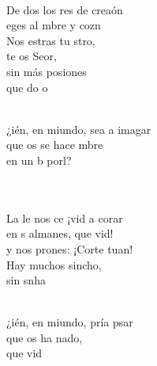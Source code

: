 \begin{cancion}
	  \\
\jump
	De dos los res de  creaón\\
	eges al mbre y  cozn \\
	Nos estras tu stro, \\
	te os Seor,\\
	sin más posiones \\
	que do  o \\\jump\\
	\begin{chorus}%
	¿ién, en miundo, sea a imagar \\
	que os se hace mbre\\
	en un b porl?  \\
	\end{chorus}%
	\jump\\
	   \\
	La le nos ce ¡vid a corar\\
	en s almanes, que  vid! \\
	y  nos prones: ¡Corte tuan! \\
	Hay muchos sincho, \\
	sin snha\\\jump\\
	\begin{chorus}%
	¿ién, en miundo, pría psar \\
	que os ha nado,\\
	que  vid \\

\end{chorus}
\end{cancion}
